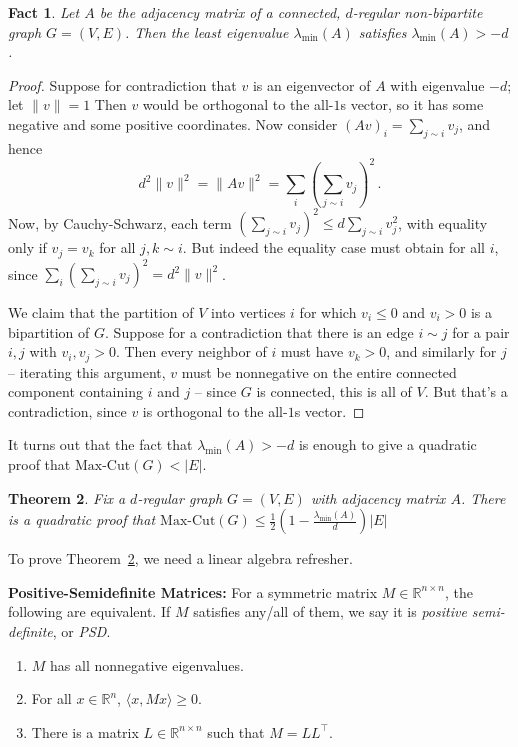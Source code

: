 \documentclass[11pt]{article}
\newtheorem{theorem}{Theorem}
\newtheorem{fact}[theorem]{Fact}
\newcommand{\paren}[1]{\left( #1 \right)}
\newcommand{\iprod}[1]{\langle #1 \rangle}
\newcommand{\R}{\mathbb{R}} %
\begin{document}
\begin{fact}
\label{fact:non-bipartite-eigenvalues}
Let $A$ be the adjacency matrix of a connected, $d$-regular non-bipartite graph $G = (V,E)$.
Then the least eigenvalue $\lambda_{\min}(A)$ satisfies $\lambda_{\min}(A) > -d$.
\end{fact}
\begin{proof}
  Suppose for contradiction that $v$ is an eigenvector of $A$ with eigenvalue $-d$; let $\|v\| = 1$
  Then $v$ would be orthogonal to the all-$1$s vector, so it has some negative and some positive coordinates.
  Now consider $(Av)_i = \sum_{j \sim i} v_j$, and hence
  \[
  d^2 \|v\|^2 = \|Av\|^2 = \sum_{i} \paren{\sum_{j \sim i} v_j}^2 \, .
  \]
  Now, by Cauchy-Schwarz, each term $(\sum_{j \sim i} v_j)^2 \leq d \sum_{j \sim i} v_j^2$, with equality only if $v_j = v_k$ for all $j,k \sim i$.
  But indeed the equality case must obtain for all $i$, since $\sum_{i} \paren{\sum_{j \sim i} v_j}^2 = d^2 \|v\|^2$.
  
  We claim that the partition of $V$ into vertices $i$ for which $v_i \leq 0$ and $v_i > 0$ is a bipartition of $G$.
  Suppose for a contradiction that there is an edge $i \sim j$ for a pair $i,j$ with $v_i,v_j > 0$.
  Then every neighbor of $i$ must have $v_k > 0$, and similarly for $j$ -- iterating this argument, $v$ must be nonnegative on the entire connected component containing $i$ and $j$ -- since $G$ is connected, this is all of $V$.
  But that's a contradiction, since $v$ is orthogonal to the all-$1$s vector.
\end{proof}

It turns out that the fact that $\lambda_{\min}(A) > -d$ is enough to give a quadratic proof that $\text{Max-Cut}(G) < |E|$.

\begin{theorem}
  \label{thm:eigenvalue-proof}
  Fix a $d$-regular graph $G = (V,E)$ with adjacency matrix $A$.
  There is a quadratic proof that $\text{Max-Cut}(G) \leq \tfrac 12 (1 - \tfrac{\lambda_{\min}(A)}{d}) |E|$
\end{theorem}
To prove Theorem~\ref{thm:eigenvalue-proof}, we need a linear algebra refresher.
\begin{tcolorbox}[colback=white, colframe=black, width=\textwidth, boxrule=0.5mm]
\textbf{Positive-Semidefinite Matrices:}
For a symmetric matrix $M \in \R^{n \times n}$, the following are equivalent.
If $M$ satisfies any/all of them, we say it is \emph{positive semi-definite}, or \emph{PSD}.
\begin{enumerate}
  \item $M$ has all nonnegative eigenvalues.
  \item For all $x \in \R^n$, $\iprod{x, Mx} \geq 0$.
  \item There is a matrix $L \in \R^{n \times n}$ such that $M = L L^\top$.
\end{enumerate}
\end{tcolorbox}
\end{document}
